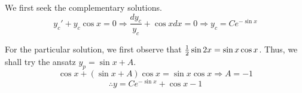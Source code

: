 \item

We first seek the complementary solutions.
\[
	y_{c}' + y_c \cos x = 0
	\Rightarrow \frac{dy_c}{y_c} + \cos x dx = 0
	\Rightarrow y_{c} = Ce^{-\sin x}
\]

For the particular solution, we first observe that $\frac{1}{2} \sin 2x = \sin x \cos x$.
Thus, we shall try the ansatz $y_p = \sin x + A$.
\[
	\cos x + (\sin x + A) \cos x = \sin x \cos x
	\Rightarrow A = -1
\]
\[
	\therefore y = Ce^{-\sin x} + \cos x - 1
\]
